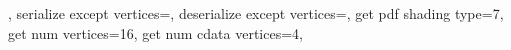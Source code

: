 {{						{\expandafter\pgfplotspointpatchvertex\pgfplotspatchclass@tensor@D\endvertex}%
		\pgfpathcurveto	{\expandafter\pgfplotspointpatchvertex\pgfplotspatchclass@tensor@E\endvertex}%
						{\expandafter\pgfplotspointpatchvertex\pgfplotspatchclass@tensor@F\endvertex}%
						{\expandafter\pgfplotspointpatchvertex\pgfplotspatchclass@tensor@G\endvertex}%
		\pgfpathcurveto	{\expandafter\pgfplotspointpatchvertex\pgfplotspatchclass@tensor@H\endvertex}%
						{\expandafter\pgfplotspointpatchvertex\pgfplotspatchclass@tensor@I\endvertex}%
						{\expandafter\pgfplotspointpatchvertex\pgfplotspatchclass@tensor@J\endvertex}%
		\pgfpathcurveto	{\expandafter\pgfplotspointpatchvertex\pgfplotspatchclass@tensor@K\endvertex}%
						{\expandafter\pgfplotspointpatchvertex\pgfplotspatchclass@tensor@L\endvertex}%
						{\expandafter\pgfplotspointpatchvertex\pgfplotspatchclass@tensor@A\endvertex}%
		\pgfpathclose
	},
	serialize except vertices=\let\pgfplotsretval\pgfutil@empty,%
	deserialize except vertices=,
	get pdf shading type=7,
	get num vertices=16,
	get num cdata vertices=4,
}%
